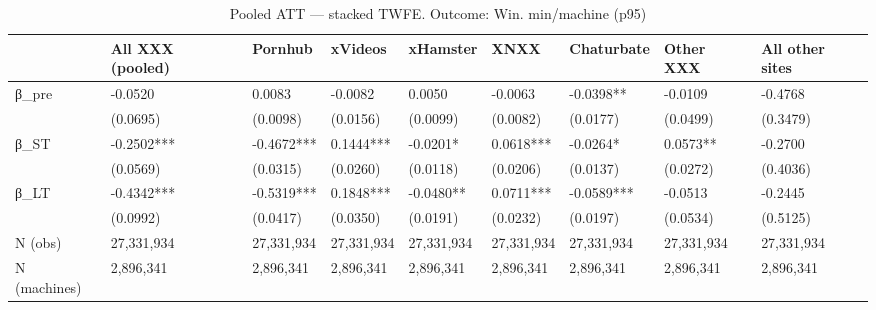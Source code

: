\begin{table}

\caption{Pooled ATT — stacked TWFE. Outcome: Win. min/machine (p95)}
\centering
\begin{tabular}[t]{lllllllll}
\toprule
  & All XXX (pooled) & Pornhub & xVideos & xHamster & XNXX & Chaturbate & Other XXX & All other sites\\
\midrule
β\_pre & -0.0520 & 0.0083 & -0.0082 & 0.0050 & -0.0063 & -0.0398** & -0.0109 & -0.4768\\
 & (0.0695) & (0.0098) & (0.0156) & (0.0099) & (0.0082) & (0.0177) & (0.0499) & (0.3479)\\
β\_ST & -0.2502*** & -0.4672*** & 0.1444*** & -0.0201* & 0.0618*** & -0.0264* & 0.0573** & -0.2700\\
 & (0.0569) & (0.0315) & (0.0260) & (0.0118) & (0.0206) & (0.0137) & (0.0272) & (0.4036)\\
β\_LT & -0.4342*** & -0.5319*** & 0.1848*** & -0.0480** & 0.0711*** & -0.0589*** & -0.0513 & -0.2445\\
\addlinespace
 & (0.0992) & (0.0417) & (0.0350) & (0.0191) & (0.0232) & (0.0197) & (0.0534) & (0.5125)\\
N (obs) & 27,331,934 & 27,331,934 & 27,331,934 & 27,331,934 & 27,331,934 & 27,331,934 & 27,331,934 & 27,331,934\\
N (machines) & 2,896,341 & 2,896,341 & 2,896,341 & 2,896,341 & 2,896,341 & 2,896,341 & 2,896,341 & 2,896,341\\
\bottomrule
\end{tabular}
\end{table}
